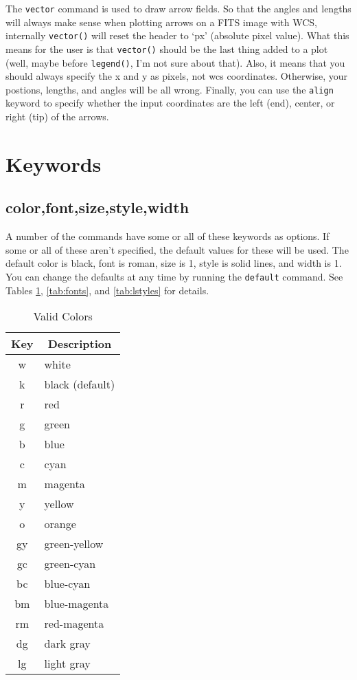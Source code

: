 \documentclass[12pt]{article}
\begin{document}
The \texttt{vector} command is used to draw arrow fields.  So that the angles
and lengths will always make sense when plotting arrows on a FITS image with
WCS, internally \texttt{vector()} will reset the header to `px' (absolute pixel
value).  What this means for the user is that \texttt{vector()} should be the
last thing added to a plot (well, maybe before \texttt{legend()}, I'm not sure
about that).  Also, it means that you should always specify the x and y as
pixels, not wcs coordinates.  Otherwise, your postions, lengths, and angles will
be all wrong.  Finally, you can use the \texttt{align} keyword to  specify
whether the input coordinates are the left (end), center, or right (tip) of the
arrows.

\section{Keywords}

\subsection{color,font,size,style,width}

A number of the commands have some or all of these keywords as options.  If
some or all of these aren't specified, the default values for these will be
used.  The default color is black, font is roman, size is 1, style is
solid lines, and width is 1.  You can change the defaults at any time by
running the \texttt{default} command.  See Tables \ref{tab:colors},
\ref{tab:fonts}, and \ref{tab:lstyles} for details.

\begin{table}
\caption{\label{tab:colors} Valid Colors}
\begin{center}
\begin{tabular}{cl}
\hline
\hline
\multicolumn{1}{c}{Key} & \multicolumn{1}{c}{Description}\\
\hline
w  & white\\
k  & black (default)\\
r  & red\\
g  & green\\
b  & blue\\
c  & cyan\\
m  & magenta\\
y  & yellow\\
o  & orange\\
gy & green-yellow\\
gc & green-cyan\\
bc & blue-cyan\\
bm & blue-magenta\\
rm & red-magenta\\
dg & dark gray\\
lg & light gray\\
\hline
\end{tabular}
\end{center}
\end{table}
\end{document}

